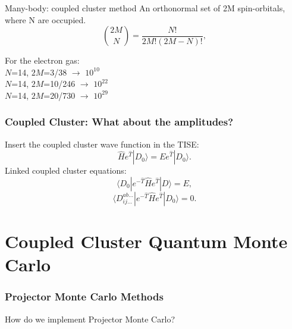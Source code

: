 \documentclass{beamer}
\begin{document}
  \begin{frame}{Many-body: coupled cluster method}
  An orthonormal set of 2M spin-orbitals, where N are occupied.
\begin{equation*}
\binom {2M}{N} = \frac{N!}{2M!(2M-N)!}, 
\end{equation*}

For the electron gas:\\

$N$=14, $2M$=3/38	$\rightarrow$ $10^{10}$\\
$N$=14, $2M$=10/246	$\rightarrow$ $10^{22}$\\
$N$=14, $2M$=20/730	$\rightarrow$ $10^{29}$

\end{frame}
\begin{frame}
\frametitle{Coupled Cluster: What about the amplitudes?}
Insert the coupled cluster wave function in the TISE:
\begin{equation*}
\hat{H}e^{\hat{T}}|D_0\rangle = Ee^{\hat{T}}|D_0\rangle.	
\end{equation*}
Linked coupled cluster equations:
\begin{equation*}
\langle D_0|e^{-\hat{T}}\hat{H}e^{\hat{T}}|D\rangle = E,
\end{equation*}
\begin{equation*}
\langle D_{ij\dots}^{ab\dots}|e^{-\hat{T}}\hat{H}e^{\hat{T}}|D_0 \rangle = 0.
\end{equation*}

\end{frame}


\section{Coupled Cluster Quantum Monte Carlo}

\begin{frame}
\frametitle{Projector Monte Carlo Methods}
How do we implement Projector Monte Carlo?
\begin{itemize}
\end{itemize}
\end{frame}
\end{document}
